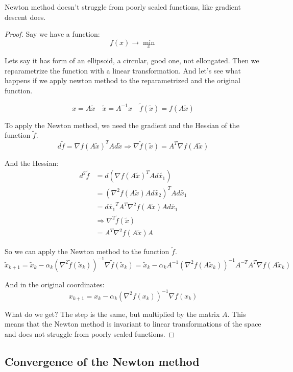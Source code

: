 \begin{theorem}
    Newton method doesn't struggle from poorly scaled functions, like gradient descent does. 
\end{theorem}
\begin{proof}
    Say we have a function: 
    \[
        f(x) \to \min_x 
    \]

    Lets say it has form of an ellipsoid, a circular, good one, not ellongated. Then we reparametrize the function with a linear transformation. And let's see what happens if we apply newton method to the reparametrized and the original function.

    \[
        x = A \tilde{x} \quad \tilde{x} = A^{-1} x \quad \tilde{f} (\tilde{x}) = f(A \tilde{x}) 
    \]

    To apply the Newton method, we need the gradient and the Hessian of the function $\tilde{f}$.
    \[
        d \tilde{f} = \nabla f (A \tilde{x})^T A d \tilde{x} \Longrightarrow \nabla \tilde{f} (\tilde{x}) = A^T \nabla f (A \tilde{x})
    \]

    And the Hessian:
    \begin{align*}
        d^2 \tilde{f} &= d (\nabla f (A \tilde{x})^T A d \tilde{x_1}) \\ 
        &= (\nabla^2 f (A \tilde{x}) A d \tilde{x_2})^T A d \tilde{x_1} \\ 
        &= d \tilde{x_1}^T A^T \nabla^2 f (A \tilde{x}) A d \tilde{x_1} \\ 
        &\Longrightarrow \nabla^2 \tilde{f} (\tilde{x}) \\ 
        &= A^T \nabla^2 f (A \tilde{x}) A
    \end{align*}

    So we can apply the Newton method to the function $\tilde{f}$.
    \[
        \tilde{x}_{k+1} = \tilde{x}_k - \alpha_k (\nabla^2 \tilde{f} (\tilde{x}_k))^{-1} \nabla \tilde{f} (\tilde{x}_k) = \tilde{x}_k - \alpha_k A^{-1} (\nabla^2 f (A \tilde{x}_k))^{-1} A^{-T} A^{T} \nabla f (A \tilde{x}_k)
    \]

    And in the original coordinates: 
    \[ 
        x_{k+1} = x_k - \alpha_k (\nabla^2 f (x_k))^{-1} \nabla f (x_k)
    \]

    What do we get? The step is the same, but multiplied by the matrix $A$. This means that the Newton method is invariant to linear transformations of the space and does not struggle from poorly scaled functions.
\end{proof}

\subsection{Convergence of the Newton method}

